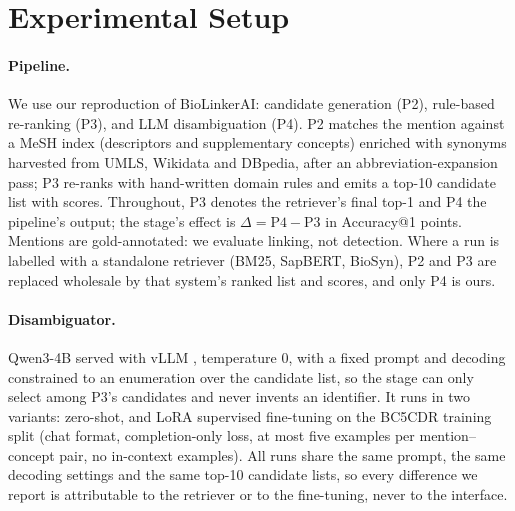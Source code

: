 \documentclass[11pt]{article}
\makeatletter
\newcommand{\acc}{Accuracy@1}
\makeatother
\begin{document}
\section{Experimental Setup}\label{sec:setup}

\paragraph{Pipeline.}
We use our reproduction of BioLinkerAI: candidate generation (P2), rule-based
re-ranking (P3), and LLM disambiguation (P4). P2 matches the mention against a MeSH
index (descriptors and supplementary concepts) enriched with synonyms harvested from
UMLS, Wikidata and DBpedia, after an abbreviation-expansion pass; P3 re-ranks with
hand-written domain rules and emits a top-10 candidate list with scores. Throughout,
P3 denotes the retriever's final top-1 and P4 the pipeline's output; the stage's
effect is $\Delta = \text{P4}-\text{P3}$ in \acc{} points. Mentions are
gold-annotated: we evaluate linking, not detection. Where a run is labelled with a
standalone retriever (BM25, SapBERT, BioSyn), P2 and P3 are replaced wholesale by
that system's ranked list and scores, and only P4 is ours.

\paragraph{Disambiguator.}
Qwen3-4B \citep{yang-etal-2025-qwen3} served with vLLM
\citep{kwon-etal-2023-efficient}, temperature $0$, with a fixed prompt and decoding
constrained to an enumeration over the candidate list, so the stage can only select
among P3's candidates and never invents an identifier. It runs in two variants:
zero-shot, and LoRA \citep{hu-etal-2022-lora} supervised fine-tuning on the BC5CDR
training split (chat format, completion-only loss, at most five examples per
mention--concept pair, no in-context examples). All runs share the same prompt, the
same decoding settings and the same top-10 candidate lists, so every difference we
report is attributable to the retriever or to the fine-tuning, never to the
interface.
\end{document}
